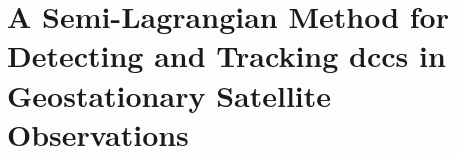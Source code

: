 \chapter{A Semi-Lagrangian Method for Detecting and Tracking \acrshort{dcc}s in Geostationary Satellite Observations} \label{chp:tracking_method}




